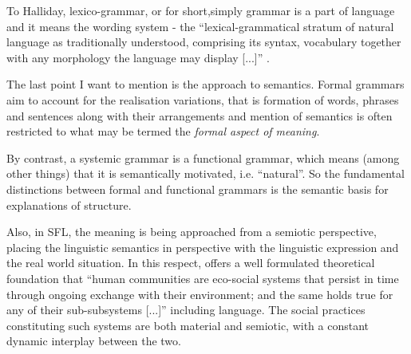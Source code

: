 
\begin{definition}\label{def:grammar-halliday}
	To Halliday, lexico-grammar, or for short,simply grammar is a part of language and it means the wording system - the ``lexical-grammatical stratum of natural language as traditionally understood, comprising its syntax, vocabulary together with any morphology the language may display [...]'' \citep[369]{Halliday2002}.
\end{definition}


The last point I want to mention is the approach to semantics. Formal grammars aim to account for the realisation variations, that is formation of words, phrases and sentences along with their arrangements and mention of semantics is often restricted to what may be termed the \textit{formal aspect of meaning}. 

By contrast, a systemic grammar is a functional grammar, which means (among other things) that it is semantically motivated, i.e. ``natural''. 
So the fundamental distinctions between formal and functional grammars is the semantic basis for explanations of structure. 

Also, in SFL, the meaning is being approached from a semiotic perspective, placing the linguistic semantics in perspective with the linguistic expression and the real world situation. 
In this respect, \citet{Lemke93} offers a well formulated theoretical foundation that ``human communities are eco-social systems that persist in time through ongoing exchange with their environment; and the same holds true for any of their sub-subsystems [...]'' including language. The social practices constituting such systems are both material and semiotic, with a constant dynamic interplay between the two. \citep[387]{Halliday2002}

